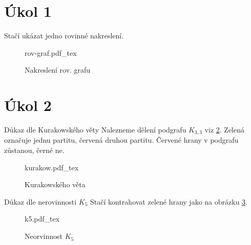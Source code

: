 \documentclass[a4paper]{article}
\newcommand{\incfig}[1]{%
    \def\svgwidth{\columnwidth}
    {#1.pdf_tex}
}
\begin{document}
\section{Úkol 1}
Stačí ukázat jedno rovinné nakreslení.
\begin{figure}[ht]
    \centering
    \incfig{rov-graf}
    \caption{Nakreslení rov. grafu}
    \label{fig:rov-graf}
\end{figure}
\section{Úkol 2}
    \begin{subsection}{Důkaz dle Kurakowského věty}
        Nalezneme dělení podgrafu $K_{3,3}$ viz \ref{fig:Kurakovského věta}. 
        Zelená označuje jednu partitu, červená druhou partitu. Červené hrany v podgrafu zůstanou, černé ne.
\begin{figure}[ht]
    \centering
    \incfig{kurakow}
    \caption{Kurakowského věta}
    \label{fig:Kurakovského věta}
\end{figure}
    \end{subsection}
    \pagebreak
    \begin{subsection}{Důkaz dle nerovinnosti $K_5$}
        Stačí kontrahovat zelené hrany jako na obrázku \ref{fig:k5}.
\begin{figure}[ht]
    \centering
    \incfig{k5}
    \caption{Neorvinnost $K_5$}
    \label{fig:k5}
\end{figure}
        
    \end{subsection}
\end{document}
